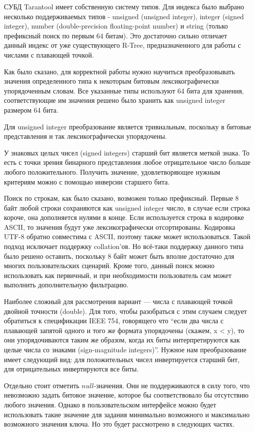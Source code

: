 СУБД Tarantool имеет собственную систему типов. Для индекса было выбрано несколько поддерживаемых типов - unsigned (unsigned integer), integer (signed integer), number (double-precision floating-point number) и string (только префиксный поиск по первым 64 битам). Это достаточно сильно отличает данный индекс от уже существующего R-Tree, предназначенного для работы с числами с плавающей точкой. 

Как было сказано, для корректной работы нужно научиться преобразовывать значения определенного типа к некоторым битовым лексикографически упорядоченным словам. Все указанные типы используют 64 бита для хранения, соответствующие им значения решено было хранить как unsigned integer размером 64 бита. 

Для unsigned integer преобразование является тривиальным, поскольку в битовые представления и так лексикографически упорядочены. 

У знаковых целых чисел (signed integers) старший бит является меткой знака. То есть с точки зрения бинарного представления любое отрицательное число больше любого положительного. Получить значение, удовлетворяющее нужным критериям можно с помощью инверсии старшего бита.

Поиск по строкам, как было сказано, возможен только префиксный. Первые 8 байт любой строки сохраняются как unsigned integer число, в случае если строка короче, она дополняется нулями в конце. Если используется строка в кодировке ASCII, то значения будут уже лексикографически отсортированы. Кодировка UTF-8 обратно совместима с ASCII, поэтому также может использоваться. Такой подход исключает поддержку collation’ов. Но всё-таки поддержку данного типа было решено оставить, поскольку 8 байт может быть вполне достаточно для многих пользовательских сценарий. Кроме того, данный поиск можно использовать как первичный, и при необходимости пользователь сам может выполнить дополнительную фильтрацию.

Наиболее сложный для рассмотрения вариант --- числа с плавающей точкой двойной точности (double).
Для того, чтобы разобраться с этим случаем следует обратиться к спецификации IEEE 754,
говорящего что “если два числа с плавающей запятой одного и того же формата упорядочены (скажем, x < y),
то они упорядочиваются таким же образом, когда их биты интерпретируются как целые числа со знаками (sign-magnitude integers)”.
Нужное нам преобразование имеет следующий вид: для положительных чисел инвертируется старший бит, для отрицательных инвертируются все биты.

Отдельно стоит отметить $null$-значения. Они не поддерживаются в силу того, что невозможно задать битовое значение, которое бы соответствовало бы отсутствию любого значения.
Однако в пользовательском интерфейсе можно будет использовать такие значение для задания минимально возможного и максимально возможного значения ключа. Но это будет рассмотрено в следующих частях.

